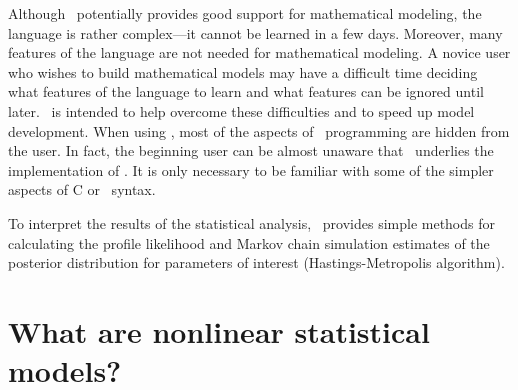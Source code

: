 \documentclass{admbmanual}
\begin{document}
Although \cplus\ potentially provides good support for mathematical modeling,
the language is rather complex---it cannot be learned in a few days. Moreover,
many features of the language are not needed for mathematical modeling. A novice
user who wishes to build mathematical models may have a difficult time deciding
what features of the language to learn and what features can be ignored until
later. \ADM\ is intended to help overcome these difficulties and to speed up
model development. When using \ADM, most of the aspects of \cplus\ programming
are hidden from the user. In fact, the beginning user can be almost unaware that
\cplus\ underlies the implementation of \ADM. It is only necessary to be
familiar with some of the simpler aspects of C or \cplus~syntax.

To interpret the results of the statistical analysis, \ADM\ provides simple
methods for calculating the profile likelihood and Markov chain simulation
estimates of the posterior distribution for parameters of interest
(Hastings-Metropolis algorithm).

\section{What are nonlinear statistical models?}
\end{document}
